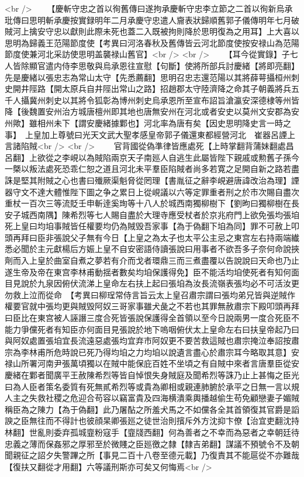 <br />
　　【慶斬守忠之首以徇舊傳曰遂拘承慶斬守忠李立節之二首以徇新烏承玭傳曰思明斬承慶按實録明年二月承慶守忠遣人齎表狀歸順舊郭子儀傳明年七月破賊河上擒安守忠以獻則此際未死也蓋二入既被拘則降於思明復為之用耳】上大喜以思明為歸義王范陽節度使【考異曰河洛春秋及舊傳皆云河北節度使按安禄山為范陽節度使兼河北采訪使思明盖襲禄山舊官】<br />
<br />
　　【耳今從實錄】子七人皆除顯官遣内侍李思敬與烏承恩往宣慰【句斷】使將所部兵討慶緒【將即亮翻】先是慶緒以張忠志為常山太守【先悉薦翻】思明召忠志還范陽以其將薛萼攝桓州刺史開井陘路【開太原兵自井陘出常山之路】招趙郡太守陸濟降之命其子朝義將兵五千人攝冀州刺史以其將令狐彰為博州刺史烏承恩所至宣布詔旨滄瀛安深德棣等州皆降【後魏置安州治方城唐檀州即其地也唐無安州在河北或者安史以莫州文安郡為安州歟】雖相州未下【謂安慶緒據鄴也】河北率為唐有矣【因史思明降史言一時之事】　上皇加上尊號曰光天文武大聖孝感皇帝郭子儀還東都經營河北　崔器呂諲上言諸陷賊<br />
<br />
　　官背國從偽準律皆應處死【上時掌翻背蒲妹翻處昌呂翻】上欲從之李峴以為賊陷兩京天子南廵人自逃生此屬皆陛下親戚或勲舊子孫今一槩以叛法處死恐乖仁恕之道且河北未平羣臣陷賊者尚多若寛之足開自新之路若盡誅是堅其附賊之心也書曰殱厥渠魁脅從罔理【書胤征之辭李峴避唐諱改治為理】諲器守文不達大體惟陛下圖之争之累日上從峴議以六等定罪重者刑之於市次賜自盡次重杖一百次三等流貶壬申斬逹奚珣等十八人於城西南獨柳樹下【劉昫曰獨柳樹在長安子城西南隅】陳希烈等七人賜自盡於大理寺應受杖者於京兆府門上欲免張均張垍死上皇曰均垍事賊皆任權要均仍為賊毁吾家事【為于偽翻下垍為同】罪不可赦上叩頭再拜曰臣非張說父子無有今日【上皇之為太子也太平公主忌之東宫左右持兩端纎悉必聞於主元獻楊后方娠上皇不自安密語侍讀張說曰用事者不欲吾多子奈何命說挾劑而入上皇於曲室自煮之夢若有介而戈者環鼎三而三煮盡覆以告說說曰天命也乃止遂生帝及帝在東宫李林甫動揺者數矣均垍保護得免】臣不能活均垍使死者有知何面目見說於九泉因俯伏流涕上皇命左右扶上起曰張垍為汝長流嶺表張均必不可活汝更勿救上泣而從命　【考異曰柳珵常侍言旨云太上皇召肅宗謂曰張均弟兄皆與逆賊作權要官就中張均更與賊毁阿奴三哥家事雖犬彘之不若也其罪無赦肅宗下殿叩頭再拜曰臣比在東宫被人誣譖三度合死皆張說保護得全首領以至今日說兩男一度合死臣不能力爭儻死者有知臣亦何面目見張說於地下嗚咽俯伏太上皇命左右曰扶皇帝起乃曰與阿奴處置張垍宜長流遠惡處張均宜弃市阿奴更不要苦救這賊也肅宗掩泣奉詔按肅宗為李林甫所危時說已死乃得均垍之力均垍以說遺言盡心於肅宗耳今略取其意】安禄山所署河南尹張萬頃獨以在賊中能保庇百姓不坐頃之有自賊中來者言唐羣臣從安慶緒在鄴者聞廣平王赦陳希烈等皆自悼恨失身賊庭及聞希烈等誅乃止上甚悔之臣光曰為人臣者策名委質有死無貳希烈等或貴為卿相或親連肺腑於承平之日無一言以規人主之失救社稷之危迎合苟容以竊富貴及四海横潰乘輿播越偷生苟免顧戀妻子媚賊稱臣為之陳力【為于偽翻】此乃屠酟之所羞犬馬之不如儻各全其首領復其官爵是謟諛之臣無往而不得計也彼顔杲卿張廵之徒世治則擯斥外方沈抑卞僚【治宜吏翻沈持林翻】世亂則委弃孤城韲粉寇手【韲牋西翻】何為善者之不幸而為惡者之幸朝廷待忠義之薄而保姦邪之厚邪至於微賤之臣廵徼之隸【隸吉弟翻】謀議不預號令不及朝聞親征之詔夕失警蹕之所【事見二百十八卷至德元載】乃復責其不能扈從不亦難哉【復扶又翻從才用翻】六等議刑斯亦可矣又何悔焉<br />
